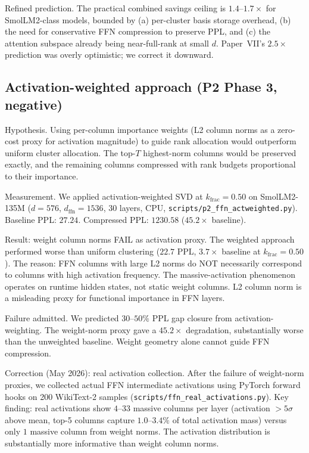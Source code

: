 \documentclass[11pt]{article}
\begin{document}
Refined prediction.  The practical combined savings ceiling is
$1.4$--$1.7{\times}$ for SmolLM2-class models, bounded by (a) per-cluster
basis storage overhead, (b) the need for conservative FFN compression to
preserve PPL, and (c) the attention subspace already being near-full-rank
at small $d$.  Paper~VII's $2.5{\times}$ prediction was overly
optimistic; we correct it downward.

\subsection{Activation-weighted approach (P2 Phase 3, negative)}
\label{sec:p2-negative}

Hypothesis.  Using per-column importance weights (L2 column norms
as a zero-cost proxy for activation magnitude) to guide rank allocation
would outperform uniform cluster allocation.  The top-$T$ highest-norm
columns would be preserved exactly, and the remaining columns compressed
with rank budgets proportional to their importance.

Measurement.  We applied activation-weighted SVD at
$k_\text{frac}{=}0.50$ on SmolLM2-135M ($d{=}576$, $d_\text{ffn}{=}1536$,
30 layers, CPU, \texttt{scripts/p2\_ffn\_actweighted.py}).
Baseline PPL: $27.24$.  Compressed PPL: $1230.58$
($45.2{\times}$ baseline).

Result: weight column norms FAIL as activation proxy.
The weighted approach performed worse than uniform clustering
($22.7$ PPL, $3.7{\times}$ baseline at $k_\text{frac}{=}0.50$).
The reason: FFN columns with large L2 norms do NOT necessarily correspond
to columns with high activation frequency.  The massive-activation
phenomenon~\cite{sun2024massive} operates on runtime hidden states, not
static weight columns.  L2 column norm is a misleading proxy for functional
importance in FFN layers.

Failure admitted.  We predicted $30$--$50\%$ PPL gap closure from
activation-weighting.  The weight-norm proxy gave a $45.2{\times}$ degradation, substantially worse than the unweighted baseline.  Weight geometry alone
cannot guide FFN compression.

Correction (May 2026): real activation collection.  After the failure
of weight-norm proxies, we collected actual FFN intermediate activations using
PyTorch forward hooks on 200 WikiText-2 samples
(\texttt{scripts/ffn\_real\_activations.py}).  Key finding: real activations
show $4$--$33$ massive columns per layer (activation $>5\sigma$ above mean,
top-5 columns capture $1.0$--$3.4\%$ of total activation mass) versus only
$1$ massive column from weight norms.  The activation distribution is
substantially more informative than weight column norms.
\end{document}
